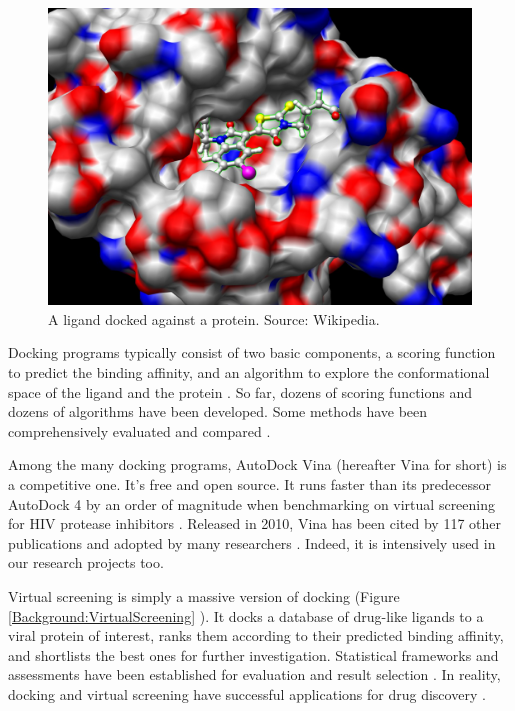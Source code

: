 \begin{figure}
\centering
\includegraphics[width=\textwidth]{Background/Docking.jpg}
\caption{A ligand docked against a protein. Source: Wikipedia.}
\label{Background:Docking}
\end{figure}

Docking programs typically consist of two basic components, a scoring function to predict the binding affinity, and an algorithm to explore the conformational space of the ligand and the protein \citep{493}. So far, dozens of scoring functions \citep{579,566,570,775,575,576,578,580,581,774} and dozens of algorithms \citep{595,564,594,602,603,604,605,606,607,781,614,615,617} have been developed. Some methods have been comprehensively evaluated and compared \citep{637,771,556}.

Among the many docking programs, AutoDock Vina \citep{595} (hereafter Vina for short) is a competitive one. It's free and open source. It runs faster than its predecessor AutoDock 4 \citep{596} by an order of magnitude when benchmarking on virtual screening for HIV protease inhibitors \citep{556}. Released in 2010, Vina has been cited by 117 other publications and adopted by many researchers \citep{609}. Indeed, it is intensively used in our research projects too.

Virtual screening is simply a massive version of docking (Figure \ref{Background:VirtualScreening} \citep{470}). It docks a database of drug-like ligands to a viral protein of interest, ranks them according to their predicted binding affinity, and shortlists the best ones for further investigation. Statistical frameworks and assessments have been established for evaluation and result selection \citep{489,491,769,583,582}. In reality, docking and virtual screening have successful applications for drug discovery \citep{495,498,751,503,752,757,506,738,761,763,766,736}.

